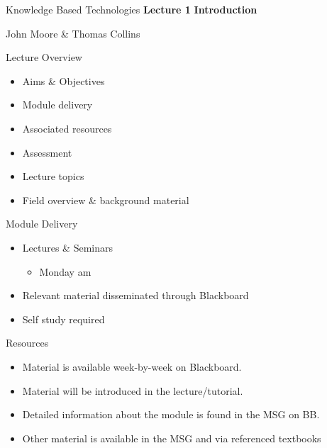 \documentclass[%
pdf,
colorBG,
slideColor,
tcrico,
]{prosper}
\begin{document}
\begin{slide}{Knowledge Based Technologies}
\large
\textbf{Lecture 1} 
\newline
\textbf{Introduction}

\bigskip
\small
John Moore \& Thomas Collins



\end{slide}



\begin{slide}{Lecture Overview}
\begin{itemize}
\item Aims \& Objectives
\item Module delivery 
\item Associated resources
\item Assessment
\item Lecture topics 
\item Field overview \& background material
\end{itemize}
\end{slide}



\begin{slide}{Module Delivery}
\begin{itemize}
\item Lectures \& Seminars
	\begin{itemize}
	\item Monday am
	\end{itemize}
\item Relevant material disseminated through Blackboard
\item Self study required
\end{itemize} 
\end{slide}




\begin{slide}{Resources}
\begin{itemize}
\item Material is available week-by-week on Blackboard.
\item Material will be introduced in the lecture/tutorial.
\item Detailed information about the module is found in the MSG on BB.
\item Other material is available in the MSG and via referenced textbooks
\end{itemize}
\end{slide}
\end{document}
